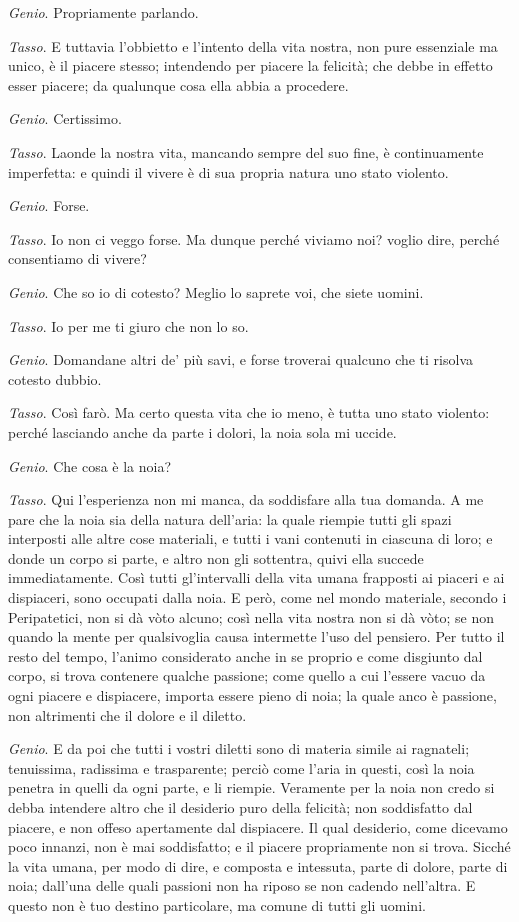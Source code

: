 \emph{Genio}. Propriamente parlando.

\emph{Tasso}. E tuttavia l'obbietto e l'intento della vita nostra, non pure essenziale ma unico, è il piacere stesso; intendendo per piacere la felicità; che debbe in effetto esser piacere; da qualunque cosa ella abbia a procedere.

\emph{Genio}. Certissimo.

\emph{Tasso}. Laonde la nostra vita, mancando sempre del suo fine, è continuamente imperfetta: e quindi il vivere è di sua propria natura uno stato violento.

\emph{Genio}. Forse.

\emph{Tasso}. Io non ci veggo forse. Ma dunque perché viviamo noi? voglio dire, perché consentiamo di vivere?

\emph{Genio}. Che so io di cotesto? Meglio lo saprete voi, che siete uomini.

\emph{Tasso}. Io per me ti giuro che non lo so.

\emph{Genio}. Domandane altri de' più savi, e forse troverai qualcuno che ti risolva cotesto dubbio.

\emph{Tasso}. Così farò. Ma certo questa vita che io meno, è tutta uno stato violento: perché lasciando anche da parte i dolori, la noia sola mi uccide.

\emph{Genio}. Che cosa è la noia?

\emph{Tasso}. Qui l'esperienza non mi manca, da soddisfare alla tua domanda. A me pare che la noia sia della natura dell'aria: la quale riempie tutti gli spazi interposti alle altre cose materiali, e tutti i vani contenuti in ciascuna di loro; e donde un corpo si parte, e altro non gli sottentra, quivi ella succede immediatamente. Così tutti gl'intervalli della vita umana frapposti ai piaceri e ai dispiaceri, sono occupati dalla noia. E però, come nel mondo materiale, secondo i Peripatetici, non si dà vòto alcuno; così nella vita nostra non si dà vòto; se non quando la mente per qualsivoglia causa intermette l'uso del pensiero. Per tutto il resto del tempo, l'animo considerato anche in se proprio e come disgiunto dal corpo, si trova contenere qualche passione; come quello a cui l'essere vacuo da ogni piacere e dispiacere, importa essere pieno di noia; la quale anco è passione, non altrimenti che il dolore e il diletto.

\emph{Genio}. E da poi che tutti i vostri diletti sono di materia simile ai ragnateli; tenuissima, radissima e trasparente; perciò come l'aria in questi, così la noia penetra in quelli da ogni parte, e li riempie. Veramente per la noia non credo si debba intendere altro che il desiderio puro della felicità; non soddisfatto dal piacere, e non offeso apertamente dal dispiacere. Il qual desiderio, come dicevamo poco innanzi, non è mai soddisfatto; e il piacere propriamente non si trova. Sicché la vita umana, per modo di dire, e composta e intessuta, parte di dolore, parte di noia; dall'una delle quali passioni non ha riposo se non cadendo nell'altra. E questo non è tuo destino particolare, ma comune di tutti gli uomini.


